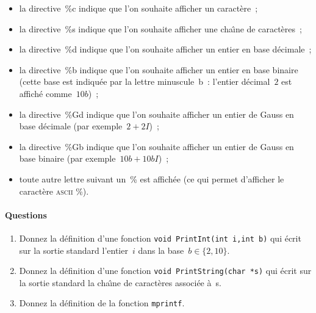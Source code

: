 \begin{itemize}
\item  la directive~\%c indique que l'on souhaite afficher un caract\`ere~;
\item la directive~\%s indique que l'on souhaite afficher une
  cha\^\i{}ne de caract\`eres~;
\item la directive~\%d indique que l'on souhaite afficher un entier en
  base d\'ecimale~;
\item la directive~\%b indique que l'on souhaite afficher un entier en
  base binaire (cette base est indiqu\'ee par la lettre
  minuscule~b~: l'entier d\'ecimal~$2$ est affich\'e comme~$10b$)~;
\item la directive~\%Gd indique que l'on souhaite afficher un entier de
  Gauss en base d\'ecimale (par exemple~$2 + 2 I$)~;
\item la directive~\%Gb indique que l'on souhaite afficher un entier
  de Gauss en base binaire (par exemple~$ 10b + 10b I$)~;
\item toute autre lettre suivant un~\% est affich\'ee (ce qui permet
  d'afficher le caract\`ere \textsc{ascii} \%).
\end{itemize}

\paragraph{Questions}
\begin{enumerate}
\item Donnez la d\'efinition d'une fonction %
  \verb?void PrintInt(int i,int b)? qui \'ecrit sur la sortie
  standard l'entier~$i$ dans la base~${b\in\{2,10\}}$.
\item 
  Donnez la d\'efinition d'une fonction %
  \verb?void PrintString(char *s)? qui \'ecrit sur la sortie standard
  la cha\^\i{}ne de caract\`eres associ\'ee \`a~s.
\item Donnez la d\'efinition de la fonction \verb?mprintf?.
\end{enumerate}

